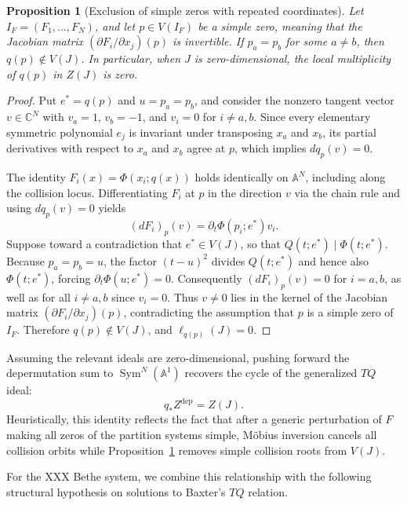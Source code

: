 \documentclass[11pt]{article}
\newtheorem{proposition}{Proposition}[section]
\theoremstyle{definition}
\newcommand{\A}{\mathbb{A}}
\newcommand{\C}{\mathbb{C}}
\newcommand{\Sym}{\operatorname{Sym}}
\begin{document}
\begin{proposition}[Exclusion of simple zeros with repeated coordinates]
\label{prop:simple-collision-tq}
Let $I_F=(F_1,\ldots,F_N)$, and let $p\in V(I_F)$ be a simple zero,
meaning that the Jacobian matrix $(\partial F_i/\partial x_j)(p)$ is
invertible. If $p_a=p_b$ for some $a\ne b$, then $q(p)\notin V(J)$.
In particular, when $J$ is zero-dimensional, the local multiplicity of $q(p)$
in $Z(J)$ is zero.
\end{proposition}

\begin{proof}
Put $e^*=q(p)$ and $u=p_a=p_b$, and consider the nonzero tangent
vector $v\in\C^N$ with $v_a=1$, $v_b=-1$, and $v_i=0$ for $i\ne a,b$.
Since every elementary symmetric polynomial $e_j$ is invariant under
transposing $x_a$ and $x_b$, its partial derivatives with respect to $x_a$ and $x_b$ agree at $p$, which implies $dq_p(v)=0$.

The identity $F_i(x)=\Phi(x_i;q(x))$ holds identically on $\A^N$, including along the collision locus.
Differentiating $F_i$ at $p$ in the direction $v$ via the chain rule and using $dq_p(v)=0$ yields
\[
 (dF_i)_p(v)=\partial_t\Phi(p_i;e^*)v_i.
\]
Suppose toward a contradiction that $e^*\in V(J)$, so that $Q(t;e^*)\mid\Phi(t;e^*)$.
Because $p_a=p_b=u$, the factor $(t-u)^2$ divides $Q(t;e^*)$ and hence also $\Phi(t;e^*)$, forcing
$\partial_t\Phi(u;e^*)=0$. Consequently $(dF_i)_p(v)=0$
for $i=a,b$, as well as for all $i\ne a,b$ since $v_i=0$.
Thus $v\ne 0$ lies in the kernel of the Jacobian matrix $(\partial F_i/\partial x_j)(p)$,
contradicting the assumption that $p$ is a simple zero of $I_F$. Therefore $q(p)\notin V(J)$, and
$\ell_{q(p)}(J)=0$.
\end{proof}

Assuming the relevant ideals are zero-dimensional, pushing forward the
depermutation sum to $\Sym^N(\A^1)$ recovers the cycle of the generalized $TQ$ ideal:
\[
q_*Z^{\mathrm{dep}}=Z(J).
\]
Heuristically, this identity reflects the fact that after a generic perturbation of $F$ making all zeros of the partition systems simple, M\"obius inversion cancels all collision orbits while Proposition~\ref{prop:simple-collision-tq} removes simple collision roots from $V(J)$.

For the XXX Bethe system, we combine this relationship with the following structural hypothesis on solutions to Baxter's $TQ$ relation.
\end{document}
